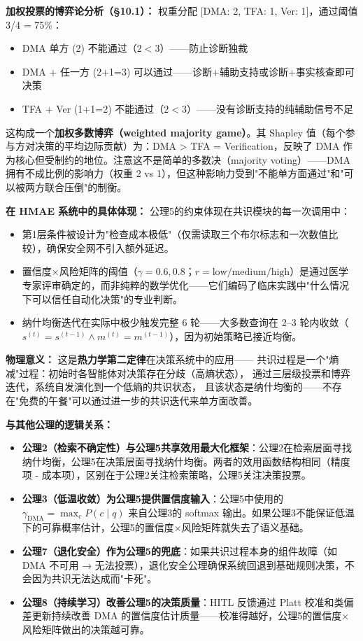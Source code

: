 \documentclass[11pt,a4paper]{ctexart}
\theoremstyle{remark}
\begin{document}
\textbf{加权投票的博弈论分析（§10.1）：} 权重分配 [DMA: 2, TFA: 1, Ver: 1]，通过阈值 3/4 = 75\%：
\begin{itemize}[nosep]
\item DMA 单方 (2) 不能通过（$2 < 3$）——防止诊断独裁
\item DMA + 任一方 (2+1=3) 可以通过——诊断+辅助支持或诊断+事实核查即可决策
\item TFA + Ver (1+1=2) 不能通过（$2 < 3$）——没有诊断支持的纯辅助信号不足
\end{itemize}
这构成一个\textbf{加权多数博弈（weighted majority game）}。其 Shapley 值（每个参与方对决策的平均边际贡献）为：DMA > TFA = Verification，反映了 DMA 作为核心但受制约的地位。注意这不是简单的多数决（majority voting）——DMA 拥有不成比例的影响力（权重 2 vs 1），但这种影响力受到"不能单方面通过"和"可以被两方联合压倒"的制衡。

\textbf{在 HMAE 系统中的具体体现：} 公理5的约束体现在共识模块的每一次调用中：
\begin{itemize}[nosep]
\item 第1层条件被设计为"检查成本极低"（仅需读取三个布尔标志和一次数值比较），确保安全网不引入额外延迟。
\item 置信度×风险矩阵的阈值（$\gamma = 0.6, 0.8$；$r = \text{low/medium/high}$）是通过医学专家评审确定的，而非纯粹的数学优化——它们编码了临床实践中"什么情况下可以信任自动化决策"的专业判断。
\item 纳什均衡迭代在实际中极少触发完整 6 轮——大多数查询在 2--3 轮内收敛（$s^{(t)} = s^{(t-1)} \land m^{(t)} = m^{(t-1)}$），因为初始策略已接近均衡。
\end{itemize}

\textbf{物理意义：} 这是\textbf{热力学第二定律}在决策系统中的应用——
共识过程是一个"熵减"过程：初始时各智能体对决策存在分歧（高熵状态），
通过三层级投票和博弈迭代，系统自发演化到一个低熵的共识状态，
且该状态是纳什均衡的——不存在"免费的午餐"可以通过进一步的共识迭代来单方面改善。

\textbf{与其他公理的逻辑关系：}
\begin{itemize}[nosep]
\item \textbf{公理2（检索不确定性）与公理5共享效用最大化框架}：公理2在检索层面寻找纳什均衡，公理5在决策层面寻找纳什均衡。两者的效用函数结构相同（精度项 - 成本项），区别在于公理2关注检索策略，公理5关注决策投票。
\item \textbf{公理3（低温收敛）为公理5提供置信度输入}：公理5中使用的 $\gamma_{\text{DMA}} = \max_c P(c \mid q)$ 来自公理3的 softmax 输出。如果公理3不能保证低温下的可靠概率估计，公理5的置信度×风险矩阵就失去了语义基础。
\item \textbf{公理7（退化安全）作为公理5的兜底}：如果共识过程本身的组件故障（如 DMA 不可用 → 无法投票），退化安全公理确保系统回退到基础规则决策，不会因为共识无法达成而"卡死"。
\item \textbf{公理8（持续学习）改善公理5的决策质量}：HITL 反馈通过 Platt 校准和类偏差更新持续改善 DMA 的置信度估计质量——校准得越好，公理5的置信度×风险矩阵做出的决策越可靠。
\end{itemize}
\end{document}
